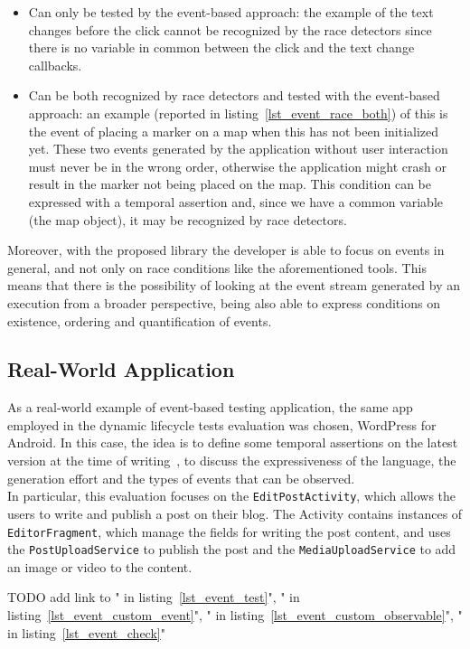 \documentclass[11pt,a4paper,notitlepage]{article}
\begin{document}
{\begin{itemize}
	\item Can only be tested by the event-based approach: the example of the text changes before the click cannot be recognized by the race detectors since there is no variable in common between the click and the text change callbacks.
	\item Can be both recognized by race detectors and tested with the event-based approach: an example (reported in listing~\ref{lst_event_race_both}) of this is the event of placing a marker on a map when this has not been initialized yet. These two events generated by the application without user interaction must never be in the wrong order, otherwise the application might crash or result in the marker not being placed on the map. This condition can be expressed with a temporal assertion and, since we have a common variable (the map object), it may be recognized by race detectors.
\end{itemize}\medskip
Moreover, with the proposed library the developer is able to focus on events in general, and not only on race conditions like the aforementioned tools. This means that there is the possibility of looking at the event stream generated by an execution from a broader perspective, being also able to express conditions on existence, ordering and quantification of events.

\subsection{Real-World Application}
As a real-world example of event-based testing application, the same app employed in the dynamic lifecycle tests evaluation was chosen, WordPress for Android. In this case, the idea is to define some temporal assertions on the latest version at the time of writing~\cite{WordPress2016-07-15}, to discuss the expressiveness of the language, the generation effort and the types of events that can be observed.\medskip \\
In particular, this evaluation focuses on the \texttt{EditPostActivity}, which allows the users to write and publish a post on their blog. The Activity contains instances of \texttt{EditorFragment}, which manage the fields for writing the post content, and uses the \texttt{PostUploadService} to publish the post and the \texttt{MediaUploadService} to add an image or video to the content.

TODO add link to " in listing~\ref{lst_event_test}", " in listing~\ref{lst_event_custom_event}", " in listing~\ref{lst_event_custom_observable}", " in listing~\ref{lst_event_check}"

}
\end{document}

